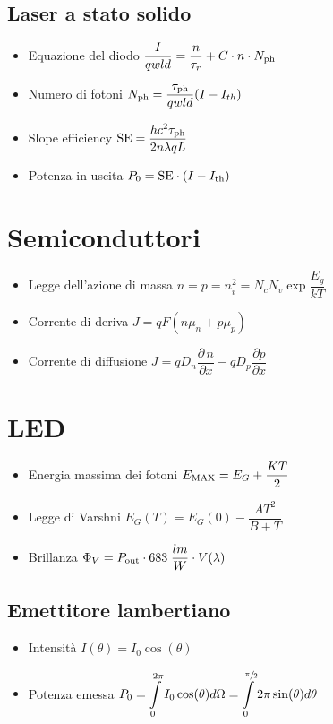 \documentclass{article}
\begin{document}
\subsection{Laser a stato solido}
\begin{itemize}
  \item Equazione del diodo \( \dfrac{I}{q w l d} = \dfrac{n}{\tau_r} + C \cdot n \cdot N_{\textnormal{ph}}\)
  \item Numero di fotoni \( N_{\textnormal{ph}} = \dfrac{\tau_{\textnormal{ph}}}{q w l d} ( I - I_{th}) \)
  \item Slope efficiency \( \textnormal{SE} = \dfrac{h c^2 \tau_{\textnormal{ph}}}{2 n  \lambda q L} \)
  \item Potenza in uscita \( P_0 = \textnormal{SE} \cdot (I - I_{\textnormal{th}} ) \)
\end{itemize}

\newpage

\section{Semiconduttori}
\begin{itemize}
  \item Legge dell'azione di massa \( n = p = n_i ^ 2 = N_c N_v \exp{\dfrac{E_g}{k T}} \)
  \item Corrente di deriva \( J = q F (n \mu_n + p \mu_p) \)
  \item Corrente di diffusione \( J = q D_n \dfrac{\partial \, n}{\partial x} - q D_p \dfrac{\partial p}{\partial x} \)
\end{itemize}

\section{LED}
\begin{itemize}
  \item Energia massima dei fotoni \( E_{\textnormal{MAX}} = E_G + \dfrac{KT}{2} \)
  \item Legge di Varshni \( E_G (T) = E_G (0) - \dfrac{A T ^2}{B+T} \)
  \item Brillanza \( \Phi_V = P_{\textnormal{out}} \cdot 683 \; \dfrac{lm}{W} \cdot V (\lambda) \)
\end{itemize}

\subsection{Emettitore lambertiano}
\begin{itemize}
  \item Intensità \( I (\theta) = I_0 \cos(\theta) \)
  \item Potenza emessa \( \displaystyle P_0 = \int\limits_{0}^{2 \pi} I_0 \cos(\theta) d\Omega = \int\limits_{0}^{\sfrac{\pi}{2}} 2 \pi \sin(\theta) d\theta \)
\end{itemize}
\end{document}
